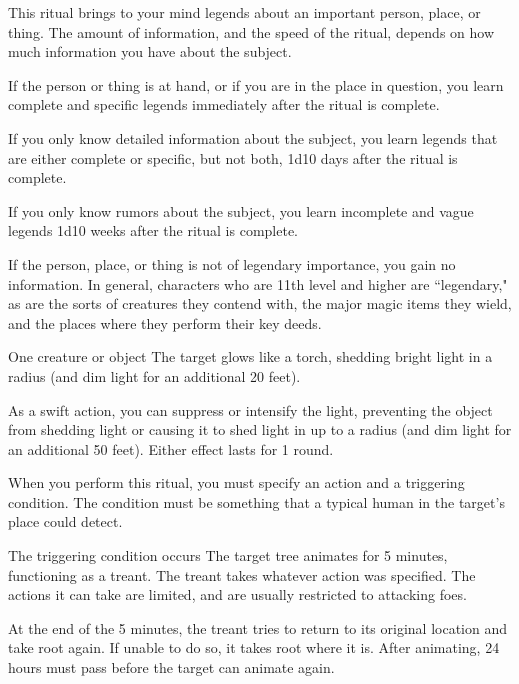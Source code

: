 \spelleffect This ritual brings to your mind legends about an important person, place, or thing. The amount of information, and the speed of the ritual, depends on how much information you have about the subject.

If the person or thing is at hand, or if you are in the place in question, you learn complete and specific legends immediately after the ritual is complete.

If you only know detailed information about the subject, you learn legends that are either complete or specific, but not both, 1d10 days after the ritual is complete.

If you only know rumors about the subject, you learn incomplete and vague legends 1d10 weeks after the ritual is complete.

\spellnotes If the person, place, or thing is not of legendary importance, you gain no information. In general, characters who are 11th level and higher are ``legendary," as are the sorts of creatures they contend with, the major magic items they wield, and the places where they perform their key deeds.

\spellrng{\rngtouch}
\spelldur{\durlong \dismissable}
\begin{spelltarget}{One creature or object}
    \spelleffect The target glows like a torch, shedding bright light in a \areamed radius (and dim light for an additional 20 feet).

    As a swift action, you can suppress or intensify the light, preventing the object from shedding light or causing it to shed light in up to a \arealarge radius (and dim light for an additional 50 feet). Either effect lasts for 1 round.
\end{spelltarget}

\spellspecial When you perform this ritual, you must specify an action and a triggering condition. The condition must be something that a typical human in the target's place could detect.
\begin{spelltrigger}{The triggering condition occurs}
    \spelleffect The target tree animates for 5 minutes, functioning as a treant. The treant takes whatever action was specified. The actions it can take are limited, and are usually restricted to attacking foes.

    At the end of the 5 minutes, the treant tries to return to its original location and take root again. If unable to do so, it takes root where it is. After animating, 24 hours must pass before the target can animate again.
\end{spelltrigger}

